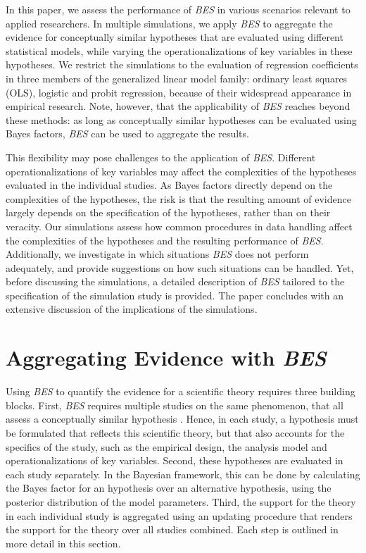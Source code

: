 \documentclass[
]{article}
\begin{document}
In this paper, we assess the performance of \emph{BES} in various
scenarios relevant to applied researchers. In multiple simulations, we
apply \emph{BES} to aggregate the evidence for conceptually similar
hypotheses that are evaluated using different statistical models, while
varying the operationalizations of key variables in these hypotheses. We
restrict the simulations to the evaluation of regression coefficients in
three members of the generalized linear model family: ordinary least
squares (OLS), logistic and probit regression, because of their
widespread appearance in empirical research. Note, however, that the
applicability of \emph{BES} reaches beyond these methods: as long as
conceptually similar hypotheses can be evaluated using Bayes factors,
\emph{BES} can be used to aggregate the results.

This flexibility may pose challenges to the application of \emph{BES}.
Different operationalizations of key variables may affect the
complexities of the hypotheses evaluated in the individual studies. As
Bayes factors directly depend on the complexities of the hypotheses, the
risk is that the resulting amount of evidence largely depends on the
specification of the hypotheses, rather than on their veracity. Our
simulations assess how common procedures in data handling affect the
complexities of the hypotheses and the resulting performance of
\emph{BES}. Additionally, we investigate in which situations \emph{BES}
does not perform adequately, and provide suggestions on how such
situations can be handled. Yet, before discussing the simulations, a
detailed description of \emph{BES} tailored to the specification of the
simulation study is provided. The paper concludes with an extensive
discussion of the implications of the simulations.

\hypertarget{aggregating-evidence-with-bes}{%
\section{\texorpdfstring{Aggregating Evidence with
\emph{BES}}{Aggregating Evidence with BES}}\label{aggregating-evidence-with-bes}}

Using \emph{BES} to quantify the evidence for a scientific theory
requires three building blocks. First, \emph{BES} requires multiple
studies on the same phenomenon, that all assess a conceptually similar
hypothesis \citep{kuiper_combining_2013}. Hence, in each study, a
hypothesis must be formulated that reflects this scientific theory, but
that also accounts for the specifics of the study, such as the empirical
design, the analysis model and operationalizations of key variables.
Second, these hypotheses are evaluated in each study separately. In the
Bayesian framework, this can be done by calculating the Bayes factor for
an hypothesis over an alternative hypothesis, using the posterior
distribution of the model parameters. Third, the support for the theory
in each individual study is aggregated using an updating procedure that
renders the support for the theory over all studies combined. Each step
is outlined in more detail in this section.
\end{document}
